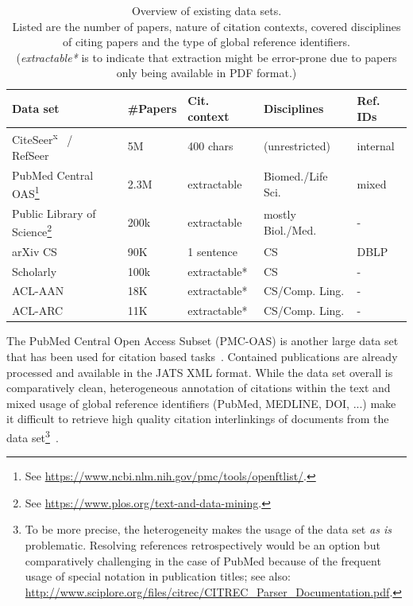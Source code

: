 \begin{table}
\centering
    \caption[Overview of existing data sets.]{Overview of existing data sets.\\Listed are the number of papers, nature of citation contexts, covered disciplines of citing papers and the type of global reference identifiers.\\(\emph{extractable*} is to indicate that extraction might be error-prone due to papers only being available in PDF format.)}
    \label{tab:datasets}
\begin{center}
    \begin{tabular}{lllll}
    \toprule
    Data set & \#Papers & Cit. context & Disciplines & Ref. IDs \\
    \midrule
    CiteSeer\textsuperscript{x}~\cite{Caragea2014} / RefSeer~\cite{Huang2014} & 5M & 400 chars & (unrestricted) & internal \\
    PubMed Central OAS\footnote{See \url{https://www.ncbi.nlm.nih.gov/pmc/tools/openftlist/}.} & 2.3M & extractable & Biomed./Life Sci. & mixed \\
    Public Library of Science\footnote{See \url{https://www.plos.org/text-and-data-mining}.} & 200k & extractable & mostly Biol./Med. & - \\
    arXiv CS~\cite{Faerber2018} &  90K & 1 sentence & CS & DBLP \\
    Scholarly~\cite{Sugiyama2013}  & 100k & extractable* & CS & - \\
    ACL-AAN~\cite{Radev2013} & 18K & extractable* & CS/Comp. Ling. & -  \\
    ACL-ARC~\cite{Bird2008} & 11K & extractable* & CS/Comp. Ling. & - \\
    \bottomrule
    \end{tabular}
\end{center}
\end{table}


The PubMed Central Open Access Subset (PMC-OAS) is another large data set that has been used for citation based tasks~\cite{Duma2016,Gipp2015,Galke2018,Bhagavatula2018}. Contained publications are already processed and available in the JATS\cite{Huh2014} XML format. While the data set overall is comparatively clean, heterogeneous annotation of citations within the text and mixed usage of global reference identifiers (PubMed, MEDLINE, DOI, ...) make it difficult to retrieve high quality citation interlinkings of documents from the data set\footnote{To be more precise, the heterogeneity makes the usage of the data set \emph{as is} problematic. Resolving references retrospectively would be an option but comparatively challenging in the case of PubMed because of the frequent usage of special notation in publication titles; see also: \url{http://www.sciplore.org/files/citrec/CITREC_Parser_Documentation.pdf}.}~\cite{Gipp2015}.

